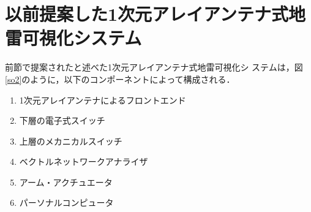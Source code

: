 ﻿\documentclass[12pt,oneside]{jsbook}
\begin{document}
\newpage
\section{以前提案した1次元アレイアンテナ式地雷可視化システム}\label{1array_before}
前節で提案されたと述べた1次元アレイアンテナ式地雷可視化シ
ステム\cite{ejiri}は，図\ref{so2}のように，以下のコンポーネントによって構成される．
\begin{enumerate}
\item 1次元アレイアンテナによるフロントエンド
\item 下層の電子式スイッチ
\item 上層のメカニカルスイッチ
\item ベクトルネットワークアナライザ
\item アーム・アクチュエータ
\item パーソナルコンピュータ
\end{enumerate}
\end{document}

